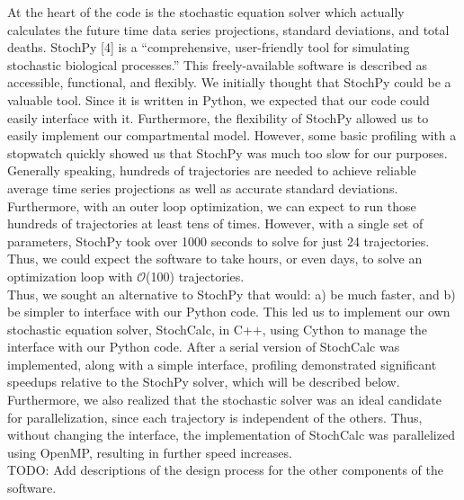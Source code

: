 \documentclass[11pt,letter]{article}
\begin{document}
At the heart of the code is the stochastic equation solver which actually calculates the future time data series projections, standard deviations, and total deaths. StochPy [4] is a ``comprehensive, user-friendly tool for simulating stochastic biological processes.'' This freely-available software is described as accessible, functional, and flexibly. We initially thought that StochPy could be a valuable tool. Since it is written in Python, we expected that our code could easily interface with it. Furthermore, the flexibility of StochPy allowed us to easily implement our compartmental model. However, some basic profiling with a stopwatch quickly showed us that StochPy was much too slow for our purposes. Generally speaking, hundreds of trajectories are needed to achieve reliable average time series projections as well as accurate standard deviations. Furthermore, with an outer loop optimization, we can expect to run those hundreds of trajectories at least tens of times. However, with a single set of parameters, StochPy took over 1000 seconds to solve for just 24 trajectories. Thus, we could expect the software to take hours, or even days, to solve an optimization loop with $\mathcal{O}$(100) trajectories.\\

Thus, we sought an alternative to StochPy that would: a) be much faster, and b) be simpler to interface with our Python code. This led us to implement our own stochastic equation solver, StochCalc, in C++, using Cython to manage the interface with our Python code. After a serial version of StochCalc was implemented, along with a simple interface, profiling demonstrated significant speedups relative to the StochPy solver, which will be described below. Furthermore, we also realized that the stochastic solver was an ideal candidate for parallelization, since each trajectory is independent of the others. Thus, without changing the interface, the implementation of StochCalc was parallelized using OpenMP, resulting in further speed increases.\\

TODO: Add descriptions of the design process for the other components of the software.\\
\end{document}
